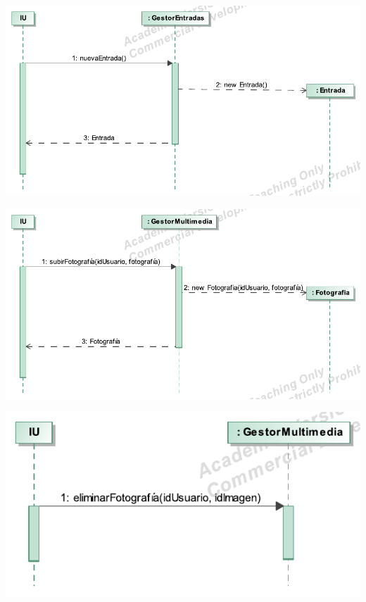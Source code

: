 \documentclass[12pt, a4paper, titlepage]{article}
\begin{document}
\begin{center}
	\includegraphics{Imagenes/OperacionNuevaEntrada.pdf}
\end{center}

\begin{center}
	\includegraphics{Imagenes/OperacionSubirFotografia}
\end{center}

\begin{center}
	\includegraphics{Imagenes/OperacionEliminarFotografia}
\end{center}
\end{document}
